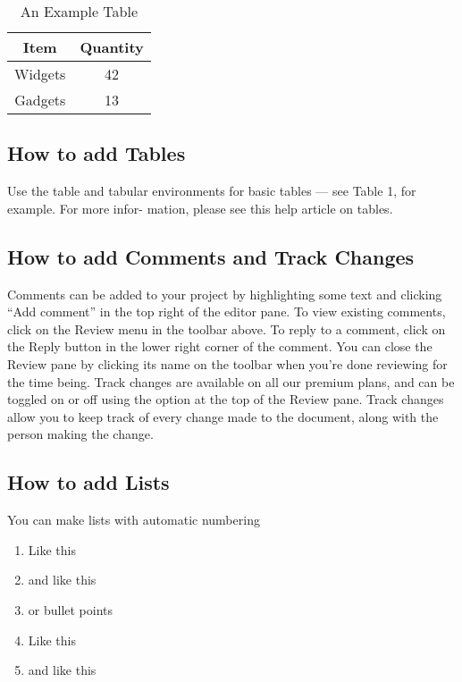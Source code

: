 \documentclass{article}
\begin{document}

 	\begin{table}[h]
 		\centering
 		\begin{tabular}{|c|c|}
 			\hline
 			\textbf{Item} & \textbf{Quantity}\\  
 			\hline
 			Widgets & 42\\
 			\hline
 			 Gadgets & 13\\
 			 \hline
 			\end{tabular}
 	
 		\caption{An Example Table}
 		\label{tab:example}
 	\end{table}
 
\subsection{How to add Tables}
	Use the table and tabular environments for basic tables — see Table 1, for example. For more infor-
	mation, please see this help article on tables.
	
	
	
	
	
\subsection{How to add Comments and Track Changes}
	Comments can be added to your project by highlighting some text and clicking “Add comment” in
	the top right of the editor pane. To view existing comments, click on the Review menu in the toolbar
	above. To reply to a comment, click on the Reply button in the lower right corner of the comment.
	You can close the Review pane by clicking its name on the toolbar when you’re done reviewing for the
	time being.
	Track changes are available on all our premium plans, and can be toggled on or off using the option
	at the top of the Review pane. Track changes allow you to keep track of every change made to the
	document, along with the person making the change.
 \subsection{How to add Lists}
 You can make lists with automatic numbering
 \begin{enumerate}
 	\item Like this
 	\item and like this 
 	\item or bullet points
 	\item Like this
 	\item and like this
 \end{enumerate}
 
\end{document}
